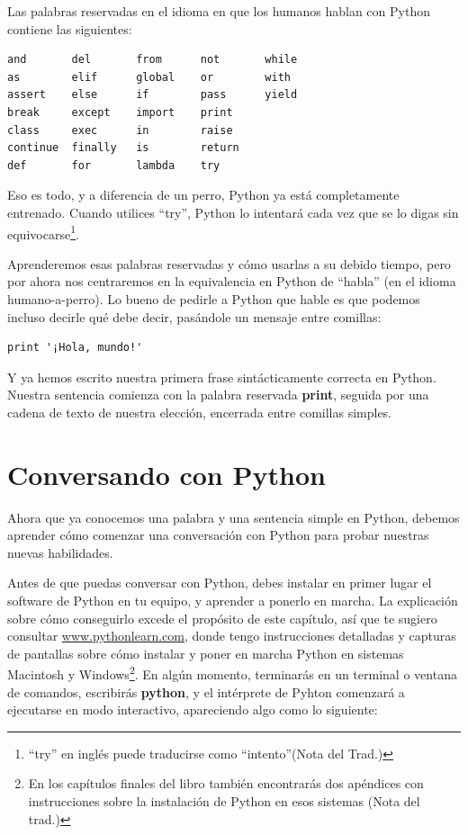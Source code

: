 Las palabras reservadas en el idioma en que los humanos hablan con
Python contiene las siguientes:

\beforeverb
\begin{verbatim}
and       del       from      not       while    
as        elif      global    or        with     
assert    else      if        pass      yield    
break     except    import    print              
class     exec      in        raise              
continue  finally   is        return             
def       for       lambda    try
\end{verbatim}
\afterverb
%
Eso es todo, y a diferencia de un perro, Python ya está completamente entrenado.
Cuando utilices ``try'', Python lo intentará cada vez que se lo digas sin
equivocarse\footnote{``try'' en inglés puede traducirse como ``intento''(Nota del Trad.)}.

Aprenderemos esas palabras reservadas y cómo usarlas a su debido tiempo,
pero por ahora nos centraremos en la equivalencia en Python de ``habla''
(en el idioma humano-a-perro). Lo bueno de pedirle a Python que hable
es que podemos incluso decirle qué debe decir, pasándole un mensaje entre comillas:

\beforeverb
\begin{verbatim}
print '¡Hola, mundo!'
\end{verbatim}
\afterverb

Y ya hemos escrito nuestra primera frase sintácticamente correcta en Python.
Nuestra sentencia comienza con la palabra reservada {\bf print}, seguida
por una cadena de texto de nuestra elección, encerrada entre comillas simples.

\section{Conversando con Python}

Ahora que ya conocemos una palabra y una sentencia simple en Python,
debemos aprender cómo comenzar una conversación con Python para probar
nuestras nuevas habilidades.

Antes de que puedas conversar con Python, debes instalar en primer lugar
el software de Python en tu equipo, y aprender a ponerlo en marcha.
La explicación sobre cómo conseguirlo excede el propósito de este capítulo,
así que te sugiero consultar \url{www.pythonlearn.com}, donde tengo
instrucciones detalladas y capturas de pantallas sobre cómo instalar y poner en marcha
Python en sistemas Macintosh y Windows\footnote{En los capítulos finales del libro también
encontrarás dos apéndices con instrucciones sobre la instalación de Python en esos sistemas (Nota
del trad.)}. En algún momento, terminarás en un terminal
o ventana de comandos, escribirás {\bf python}, y el intérprete de Pyhton
comenzará a ejecutarse en modo interactivo, apareciendo algo como lo siguiente:


